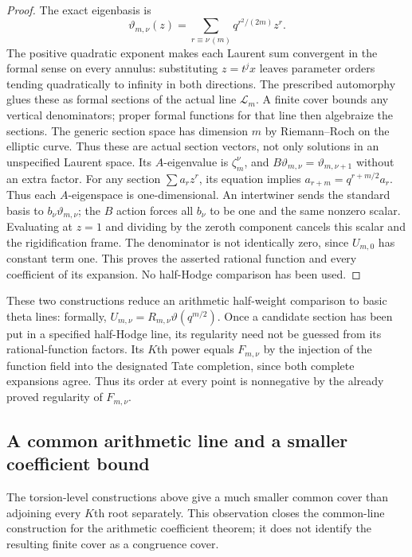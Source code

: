 \documentclass[11pt]{article}
\theoremstyle{remark}\newtheorem{remark}[theorem]{Remark}
\begin{document}
\begin{proof}
The exact eigenbasis is
\[
 \vartheta_{m,\nu}(z)=\sum_{r\equiv\nu\, (m)}q^{r^2/(2m)}z^r.
\]
The positive quadratic exponent makes each Laurent sum convergent
in the formal sense on every annulus: substituting $z=t^jx$ leaves
parameter orders tending quadratically to infinity in both directions.
The prescribed automorphy glues these as formal sections of the actual
line $\mathcal L_m$. A finite cover bounds any vertical denominators;
proper formal functions for that line then algebraize the sections.
The generic section space has dimension $m$ by Riemann--Roch on the
elliptic curve. Thus these are actual section vectors, not only
solutions in an unspecified Laurent space.
Its $A$-eigenvalue is $\zeta_m^\nu$, and
$B\vartheta_{m,\nu}=\vartheta_{m,\nu+1}$ without an extra factor.
For any section $\sum a_rz^r$, its equation implies
$a_{r+m}=q^{r+m/2}a_r$. Thus each $A$-eigenspace is one-dimensional.
An intertwiner sends the standard basis to
$b_\nu\vartheta_{m,\nu}$; the $B$ action forces all $b_\nu$ to be
one and the same nonzero scalar. Evaluating at $z=1$ and dividing by
the zeroth component cancels this scalar and the rigidification frame.
The denominator is not identically zero, since $U_{m,0}$ has constant
term one. This proves the asserted rational function and every
coefficient of its expansion. No half-Hodge comparison has been used.
\end{proof}

These two constructions reduce an arithmetic half-weight comparison to
basic theta lines: formally,
$U_{m,\nu}=R_{m,\nu}\vartheta(q^{m/2})$.
Once a candidate section has been put in a specified half-Hodge line,
its regularity need not be guessed from its rational-function factors.
Its $K$th power equals $F_{m,\nu}$ by the injection of the function
field into the designated Tate completion, since both complete
expansions agree. Thus its order at every point is nonnegative by the
already proved regularity of $F_{m,\nu}$.

\subsection{A common arithmetic line and a smaller coefficient bound}
The torsion-level constructions above give a much smaller common cover
than adjoining every $K$th root separately. This observation closes the
common-line construction for the arithmetic coefficient theorem; it does
not identify the resulting finite cover as a congruence cover.
\end{document}
